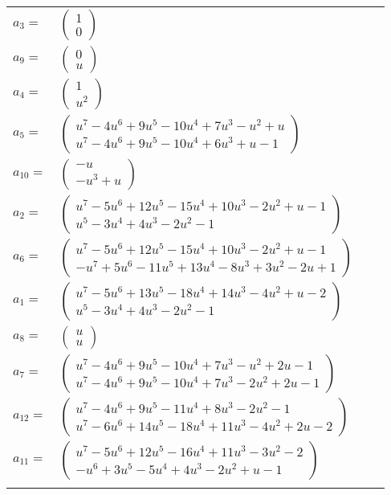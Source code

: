 \documentclass[1p]{elsarticle_modified}
\theoremstyle{definition}
\begin{document}
\begin{tabular}{m{7pt} m{180pt} m{7pt} m{180pt} }
\flushright $a_{3}=$&$\begin{pmatrix}1\\0\end{pmatrix}$ \\
\flushright $a_{9}=$&$\begin{pmatrix}0\\u\end{pmatrix}$ \\
\flushright $a_{4}=$&$\begin{pmatrix}1\\u^2\end{pmatrix}$ \\
\flushright $a_{5}=$&$\begin{pmatrix}u^7-4 u^6+9 u^5-10 u^4+7 u^3- u^2+u\\u^7-4 u^6+9 u^5-10 u^4+6 u^3+u-1\end{pmatrix}$ \\
\flushright $a_{10}=$&$\begin{pmatrix}- u\\- u^3+u\end{pmatrix}$ \\
\flushright $a_{2}=$&$\begin{pmatrix}u^7-5 u^6+12 u^5-15 u^4+10 u^3-2 u^2+u-1\\u^5-3 u^4+4 u^3-2 u^2-1\end{pmatrix}$ \\
\flushright $a_{6}=$&$\begin{pmatrix}u^7-5 u^6+12 u^5-15 u^4+10 u^3-2 u^2+u-1\\- u^7+5 u^6-11 u^5+13 u^4-8 u^3+3 u^2-2 u+1\end{pmatrix}$ \\
\flushright $a_{1}=$&$\begin{pmatrix}u^7-5 u^6+13 u^5-18 u^4+14 u^3-4 u^2+u-2\\u^5-3 u^4+4 u^3-2 u^2-1\end{pmatrix}$ \\
\flushright $a_{8}=$&$\begin{pmatrix}u\\u\end{pmatrix}$ \\
\flushright $a_{7}=$&$\begin{pmatrix}u^7-4 u^6+9 u^5-10 u^4+7 u^3- u^2+2 u-1\\u^7-4 u^6+9 u^5-10 u^4+7 u^3-2 u^2+2 u-1\end{pmatrix}$ \\
\flushright $a_{12}=$&$\begin{pmatrix}u^7-4 u^6+9 u^5-11 u^4+8 u^3-2 u^2-1\\u^7-6 u^6+14 u^5-18 u^4+11 u^3-4 u^2+2 u-2\end{pmatrix}$ \\
\flushright $a_{11}=$&$\begin{pmatrix}u^7-5 u^6+12 u^5-16 u^4+11 u^3-3 u^2-2\\- u^6+3 u^5-5 u^4+4 u^3-2 u^2+u-1\end{pmatrix}$\\&\end{tabular}
\end{document}
